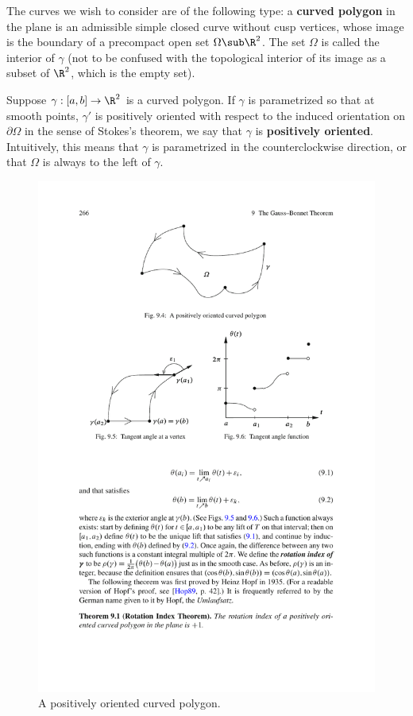 The curves we wish to consider are of the following type: a \textbf{curved polygon} in the plane is an admissible simple closed curve without cusp vertices, whose 
image is the boundary of a precompact open set $\Omega\sub\R^2$. The set $\Omega$ is called the interior of $\gamma$ (not to be confused with the topological interior 
of its image as a subset of $\R^2$, which is the empty set).\par
Suppose $\gamma:[a,b]\to\R^2$ is a curved polygon. If $\gamma$ is parametrized so that at smooth points, $\gamma'$ is positively oriented with respect to the 
induced orientation on $\partial\Omega$ in the sense of Stokes's theorem, we say that $\gamma$ is \textbf{positively oriented}. Intuitively, this means that $\gamma$ 
is parametrized in the counterclockwise direction, or that $\Omega$ is always to the left of $\gamma$.
\begin{figure}[htbp]
\centering
\includegraphics{pictures/oriented-polygon}
\caption{A positively oriented curved polygon.}
\end{figure}


